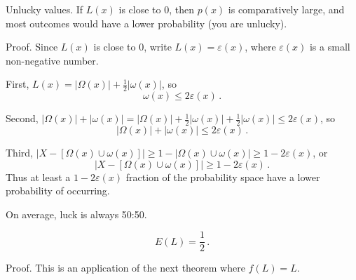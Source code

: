 \begin{theorem}{Unlucky values.}
If $L(x)$ is close to 0, then $p(x)$ is comparatively large, and most outcomes would have a lower probability (you are unlucky).

Proof.  Since $L(x)$ is close to 0, write $L(x)=\varepsilon(x)$, where $\varepsilon(x)$ is a small non-negative number.

First, $L(x)=|\Omega(x)|+\frac{1}{2}|\omega(x)|$, so
\begin{equation*}
\omega(x) \leq 2\varepsilon(x) \,.
\end{equation*}

Second, $|\Omega(x)|+|\omega(x)|=|\Omega(x)|+\frac{1}{2}|\omega(x)|+\frac{1}{2}|\omega(x)| \leq 2\varepsilon(x)$, so
\begin{equation*}
|\Omega(x)|+|\omega(x)| \leq 2\varepsilon(x) \,.
\end{equation*}

Third, $|X-[\Omega(x) \cup \omega(x)]| \geq 1-|\Omega(x) \cup \omega(x)| \geq 1-2\varepsilon(x)$, or 
\begin{equation*}
|X-[\Omega(x) \cup \omega(x)]| \geq 1-2\varepsilon(x) \,.
\end{equation*}
Thus at least a $1-2 \varepsilon(x)$ fraction of the probability space have a lower probability of occurring.
\end{theorem}

\begin{theorem}{On average, luck is always 50:50.}

\begin{equation*}
E(L)=\frac{1}{2} \,.
\end{equation*}

Proof.  This is an application of the next theorem where $f(L)=L$.
\end{theorem}

